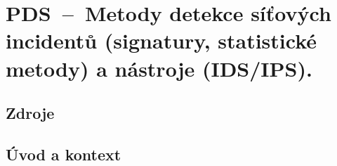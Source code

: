 

\graphicspath{{pds/detekce_sitovych_incidentu/figures}}


\chapter{PDS~--~Metody detekce síťových incidentů (signatury, statistické metody) a nástroje (IDS/IPS).}


\section{Zdroje}

\begin{compactitem}
    \item {}
    \item {}
    \item {}
    \item {}
\end{compactitem}


\section{Úvod a kontext}

